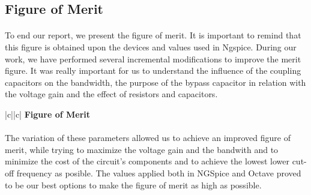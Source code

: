 \subsection{Figure of Merit}
\label{subsec:Figure_of_Merit}


\paragraph{}
To end our report, we present the figure of merit. It is important to remind that this figure is obtained upon the devices and values used in Ngspice. During our work, we have performed several incremental modifications to improve the merit figure. It was really important for us to understand the influence of the coupling capacitors on the bandwidth, the purpose of the bypass capacitor in relation with the voltage gain and the effect of resistors and capacitors. 

\begin{center}
   \begin{tabular}{|c||c|}
      \hline    
       {\bf Figure of Merit} \\
      \hline
        
   \end{tabular}
 \end{center}
 
\paragraph{}
The variation of these parameters allowed us to achieve an improved figure of merit, while trying to maximize the voltage gain and the bandwith and to minimize the cost of the circuit's components and to achieve the lowest lower cut-off frequency as posible. The values applied both in NGSpice and Octave proved to be our best options to make the figure of merit as high as possible.
